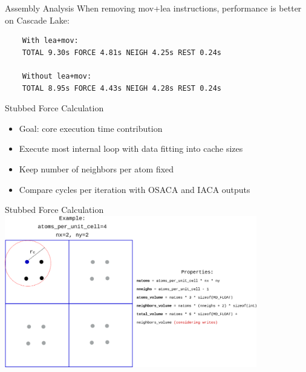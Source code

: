 \documentclass[aspectratio=169,t]{beamer}
\begin{document}
  \begin{frame}[fragile]{Assembly Analysis}
    When removing mov+lea instructions, performance is better on Cascade Lake:
    \begin{verbatim}
    With lea+mov:
    TOTAL 9.30s FORCE 4.81s NEIGH 4.25s REST 0.24s

    Without lea+mov:
    TOTAL 8.95s FORCE 4.43s NEIGH 4.28s REST 0.24s
    \end{verbatim}
  \end{frame}

  \begin{frame}[fragile]{Stubbed Force Calculation}
    \begin{itemize}
      \item Goal: core execution time contribution
      \item Execute most internal loop with data fitting into cache sizes
      \item Keep number of neighbors per atom fixed
      \item Compare cycles per iteration with OSACA and IACA outputs
    \end{itemize}
  \end{frame}

  \begin{frame}{Stubbed Force Calculation}
  \centering
    \includegraphics[width=11cm]{stubbed_force_mdbench.png}
  \end{frame}
\end{document}
